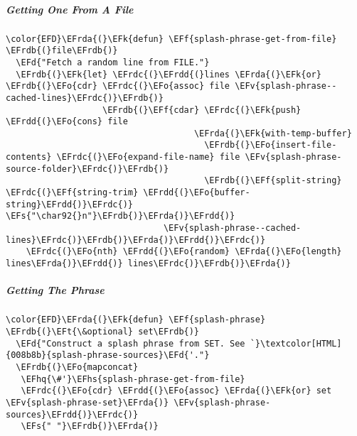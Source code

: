 \documentclass{article}
\newcommand{\EFs}[1]{\textcolor{EFs}{#1}} %
\newcommand{\EFd}[1]{\textcolor{EFd}{#1}} %
\newcommand{\EFk}[1]{\textcolor{EFk}{#1}} %
\newcommand{\EFf}[1]{\textcolor{EFf}{#1}} %
\newcommand{\EFv}[1]{\textcolor{EFv}{#1}} %
\newcommand{\EFt}[1]{\textcolor{EFt}{#1}} %
\newcommand{\EFo}[1]{\textcolor{EFo}{#1}} %
\newcommand{\EFhq}[1]{#1} %
\newcommand{\EFhs}[1]{\textcolor{EFhs}{#1}} %
\newcommand{\EFrda}[1]{\textcolor{EFrda}{#1}} %
\newcommand{\EFrdb}[1]{\textcolor{EFrdb}{#1}} %
\newcommand{\EFrdc}[1]{\textcolor{EFrdc}{#1}} %
\newcommand{\EFrdd}[1]{\textcolor{EFrdd}{#1}} %
\begin{document}
\subparagraph{Getting One From A File}
\label{sec:org7ea0694}
\begin{Code}
\begin{Verbatim}
\color{EFD}\EFrda{(}\EFk{defun} \EFf{splash-phrase-get-from-file} \EFrdb{(}file\EFrdb{)}
  \EFd{"Fetch a random line from FILE."}
  \EFrdb{(}\EFk{let} \EFrdc{(}\EFrdd{(}lines \EFrda{(}\EFk{or} \EFrdb{(}\EFo{cdr} \EFrdc{(}\EFo{assoc} file \EFv{splash-phrase--cached-lines}\EFrdc{)}\EFrdb{)}
                   \EFrdb{(}\EFf{cdar} \EFrdc{(}\EFk{push} \EFrdd{(}\EFo{cons} file
                                     \EFrda{(}\EFk{with-temp-buffer}
                                       \EFrdb{(}\EFo{insert-file-contents} \EFrdc{(}\EFo{expand-file-name} file \EFv{splash-phrase-source-folder}\EFrdc{)}\EFrdb{)}
                                       \EFrdb{(}\EFf{split-string} \EFrdc{(}\EFf{string-trim} \EFrdd{(}\EFo{buffer-string}\EFrdd{)}\EFrdc{)} \EFs{"\char92{}n"}\EFrdb{)}\EFrda{)}\EFrdd{)}
                               \EFv{splash-phrase--cached-lines}\EFrdc{)}\EFrdb{)}\EFrda{)}\EFrdd{)}\EFrdc{)}
    \EFrdc{(}\EFo{nth} \EFrdd{(}\EFo{random} \EFrda{(}\EFo{length} lines\EFrda{)}\EFrdd{)} lines\EFrdc{)}\EFrdb{)}\EFrda{)}

\end{Verbatim}
\end{Code}

\subparagraph{Getting The Phrase}
\label{sec:orgc9a88ac}
\begin{Code}
\begin{Verbatim}
\color{EFD}\EFrda{(}\EFk{defun} \EFf{splash-phrase} \EFrdb{(}\EFt{\&optional} set\EFrdb{)}
  \EFd{"Construct a splash phrase from SET. See `}\textcolor[HTML]{008b8b}{splash-phrase-sources}\EFd{'."}
  \EFrdb{(}\EFo{mapconcat}
   \EFhq{\#'}\EFhs{splash-phrase-get-from-file}
   \EFrdc{(}\EFo{cdr} \EFrdd{(}\EFo{assoc} \EFrda{(}\EFk{or} set \EFv{splash-phrase-set}\EFrda{)} \EFv{splash-phrase-sources}\EFrdd{)}\EFrdc{)}
   \EFs{" "}\EFrdb{)}\EFrda{)}
\end{Verbatim}
\end{Code}
\end{document}
